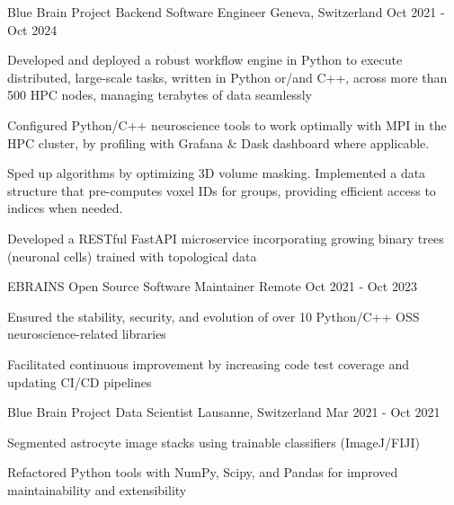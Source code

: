 \begin{cventries}
\cventry
{Blue Brain Project} %
{Backend Software Engineer} %
{Geneva, Switzerland} %
{Oct 2021 - Oct 2024} %
{ %
\begin{cvitems}
\item{Developed and deployed a robust workflow engine in Python to execute distributed, large-scale tasks, written in Python or/and C++, across more than 500 HPC nodes, managing terabytes of data seamlessly}
\item{Configured Python/C++ neuroscience tools to work optimally with MPI in the HPC cluster, by profiling with Grafana \& Dask dashboard where applicable.}
\item{Sped up algorithms by optimizing 3D volume masking. Implemented a data structure that pre-computes voxel IDs for groups, providing efficient access to indices when needed.}
\item{Developed a RESTful FastAPI microservice incorporating growing binary trees (neuronal cells) trained with topological data}
\end{cvitems}
}

\cventry
{EBRAINS}
{Open Source Software Maintainer} %
{Remote} %
{Oct 2021 - Oct 2023} %
{ %
\begin{cvitems}
\item{Ensured the stability, security, and evolution of over 10 Python/C++ OSS neuroscience-related libraries}
\item{Facilitated continuous improvement by increasing code test coverage and updating CI/CD pipelines}
\end{cvitems}
}



\cventry
{Blue Brain Project}
{Data Scientist} %
{Lausanne, Switzerland} %
{Mar 2021 - Oct 2021} %
{ %
\begin{cvitems}
\item{Segmented astrocyte image stacks using trainable classifiers (ImageJ/FIJI)}
\item{Refactored Python tools with NumPy, Scipy, and Pandas for improved maintainability and extensibility}
\end{cvitems}
}


\end{cventries}
